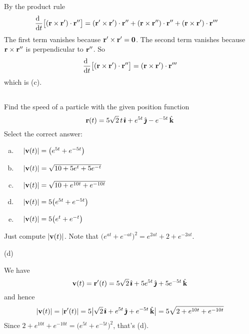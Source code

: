 \begin{solution}
By the product rule
\begin{align*}
\diff{\hfill}{t}\big[ (\vr \times \vr')\cdot\vr'' \big]
&= (\vr' \times \vr')\cdot\vr''
  +(\vr \times \vr'')\cdot\vr''
  +(\vr \times \vr')\cdot\vr'''
\end{align*}
The first term vanishes because $\mathbf{r}'\times\mathbf{r}'=\mathbf{0}$.
The second term vanishes because $\mathbf{r} \times \mathbf{r}''$ is perpendicular to
$\mathbf{r}''$. So
\begin{equation*}
\diff{\hfill}{t}\big[ (\vr \times \vr')\cdot\vr'' \big]
= (\vr \times \vr')\cdot\vr'''
\end{equation*}
which is (c).
\end{solution}
\subsection*{\Procedural}

\begin{question}[M317 2005D] %
Find the speed of a particle with the given position function
\begin{equation*}
\mathbf{r}(t) = 5 \sqrt{2}\,t\,\hat{\pmb{\imath}} + e^{5t}\,\hat{\pmb{\jmath}} - e^{-5t}\,\hat{\mathbf{k}}
\end{equation*}
Select the correct answer:
\begin{enumerate}[(a)]
\item\ \ 
$|\mathbf{v}(t)| = \big(e^{5t} + e^{-5t}\big)$
\item\ \ 
$|\mathbf{v}(t)| = \sqrt{10 + 5e^{t} + 5e^{-t}}$
\item\ \ 
$|\mathbf{v}(t)| = \sqrt{10 + e^{10t} + e^{-10t}}$
\item\ \ 
$|\mathbf{v}(t)| = 5\big(e^{5t} + e^{-5t}\big)$
\item\ \ 
$|\mathbf{v}(t)| = 5\big(e^t + e^{-t}\big)$
\end{enumerate}
\end{question}

\begin{hint} 
Just compute $|\mathbf{v}(t)|$. Note that $\big(e^{at}+e^{-at}\big)^2 
=e^{2at} + 2 + e^{-2at}$.
\end{hint}

\begin{answer} 
(d)
\end{answer}

\begin{solution}
We have
\begin{equation*}
\mathbf{v}(t) = \mathbf{r}'(t) 
      = 5 \sqrt{2}\,\hat{\pmb{\imath}} + 5e^{5t}\,\hat{\pmb{\jmath}} +5 e^{-5t}\,\hat{\mathbf{k}}
\end{equation*}
and hence
\begin{equation*}
|\mathbf{v}(t)| = |\mathbf{r}'(t)| 
         = 5 \big|\sqrt{2}\,\hat{\pmb{\imath}} + e^{5t}\,\hat{\pmb{\jmath}} + e^{-5t}\,\hat{\mathbf{k}}\big|
         = 5\sqrt{2+ e^{10t}+ e^{-10t}}
\end{equation*}
Since $2+ e^{10t}+ e^{-10t} = \big(e^{5t}+e^{-5t}\big)^2$, that's (d).
\end{solution}


